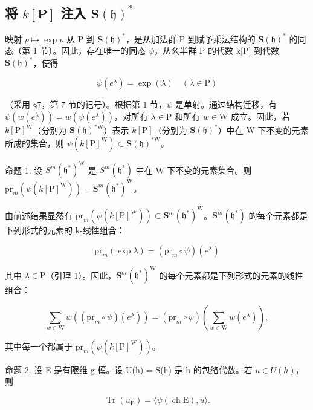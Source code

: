 \subsection{\texorpdfstring{将 \(k[\mathbf{P}]\) 注入 \(\mathbf{S}(\mathfrak{h})^{*}\)}{将 k{[}\textbackslash mathbf\{P\}{]} 注入 \textbackslash mathbf\{S\}(\textbackslash mathfrak\{h\})\^{}\{*\}}}

映射 \(p \mapsto \exp p\) 从 P 到 \(\mathbf{S}(\mathfrak{h})^{*}\)，是从加法群 P 到赋予乘法结构的 \(\mathbf{S}(\mathfrak{h})^{*}\) 的同态（第 1 节）。因此，存在唯一的同态 \(\psi\)，从幺半群 P 的代数 k{[}P{]} 到代数 \(\mathbf{S}(\mathfrak{h})^{*}\)，使得

\[
\psi (e ^ {\lambda}) = \exp (\lambda) \quad (\lambda \in \mathrm{P})
\]

（采用 §7，第 7 节的记号）。根据第 1 节，\(\psi\) 是单射。通过结构迁移，有 \(\psi(w(e^{\lambda})) = w(\psi(e^{\lambda}))\)，对所有 \(\lambda \in \mathrm{P}\) 和所有 \(w \in \mathrm{W}\) 成立。因此，若 \(k[\mathrm{P}]^{\mathrm{W}}\)（分别为 \(\mathbf{S}(\mathfrak{h})^{*\mathrm{W}}\)）表示 \(k[\mathrm{P}]\)（分别为 \(\mathbf{S}(\mathfrak{h})^{*}\)）中在 \(\mathrm{W}\) 下不变的元素所成的集合，则 \(\psi(k[\mathrm{P}]^{\mathrm{W}}) \subset \mathbf{S}(\mathfrak{h})^{*\mathrm{W}}\)。

命题 1. 设 \(S^m(\mathfrak{h}^*)^{\mathrm{W}}\) 是 \(S^m(\mathfrak{h}^*)\) 中在 W 下不变的元素集合。则 \(\mathrm{pr}_m(\psi(k[\mathrm{P}]^{\mathrm{W}})) = \mathbf{S}^m(\mathfrak{h}^*)^{\mathrm{W}}\)。

由前述结果显然有 \(\mathrm{pr}_{m}(\psi(k[\mathrm{P}]^{\mathrm{W}})) \subset \mathbf{S}^{m}(\mathfrak{h}^{*})^{\mathrm{W}}\)。\(\mathbf{S}^{m}(\mathfrak{h}^{*})\) 的每个元素都是下列形式的元素的 k-线性组合：

\[
\mathrm{pr} _ {m} (\exp \lambda) = (\mathrm{pr} _ {m} \circ \psi) (e ^ {\lambda})
\]

其中 \(\lambda \in \mathrm{P}\)（引理 1）。因此，\(\mathbf{S}^m (\mathfrak{h}^*)^{\mathrm{W}}\) 的每个元素都是下列形式的元素的线性组合：

\[
\sum_ {w \in \mathrm{W}} w ((\mathrm{pr} _ {m} \circ \psi) (e ^ {\lambda})) = (\mathrm{pr} _ {m} \circ \psi) \left(\sum_ {w \in \mathrm{W}} w (e ^ {\lambda})\right),
\]

其中每一个都属于 \(\mathrm{pr}_m(\psi (k[\mathrm{P}]^{\mathrm{W}}))\)。

命题 2. 设 E 是有限维 g-模。设 U(h) = S(h) 是 h 的包络代数。若 \(u \in U(h)\)，则

\[
\operatorname{Tr} (u _ {\mathrm{E}}) = \langle \psi (\operatorname{ch} \mathrm{E}), u \rangle .
\]

